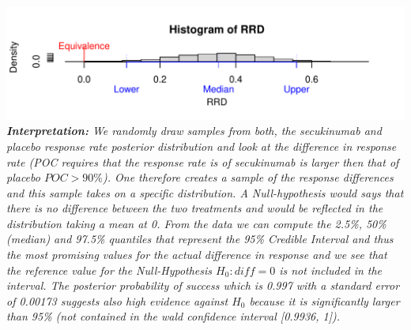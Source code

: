 \documentclass{article}\usepackage[]{graphicx}\usepackage[]{xcolor}
\makeatletter
\def\maxwidth{ %
  \ifdim\Gin@nat@width>\linewidth
    \linewidth
  \else
    \Gin@nat@width
  \fi
}
\newenvironment{knitrout}{}{} %
\makeatother
\begin{document}
\begin{multicols*}{2}
\begin{knitrout}
\color{fgcolor}
\includegraphics[width=\maxwidth]{figure/unnamed-chunk-4-1} 
\end{knitrout}
\footnotesize
\textit{\textbf{Interpretation:} We randomly draw samples from both, the secukinumab and placebo response rate posterior distribution and look at the difference in response rate (POC requires that the response rate is of secukinumab is larger then that of placebo $POC>90\%$). One therefore creates a sample of the response differences and this sample takes on a specific distribution. A Null-hypothesis would says that there is no difference between the two treatments and would be reflected in the distribution taking a mean at 0. From the data we can compute the 2.5\%, 50\% (median) and 97.5\% quantiles that represent the 95\% Credible Interval and thus the most promising values for the actual difference in response and we see that the reference value for the Null-Hypothesis $H_0:diff=0$ is not included in the interval. The posterior probability of success which is 0.997 with a standard error of 0.00173 suggests also high evidence against $H_0$ because it is significantly larger than 95\% (not contained in the wald confidence interval [0.9936, 1]).}

\end{multicols*}
\end{document}
